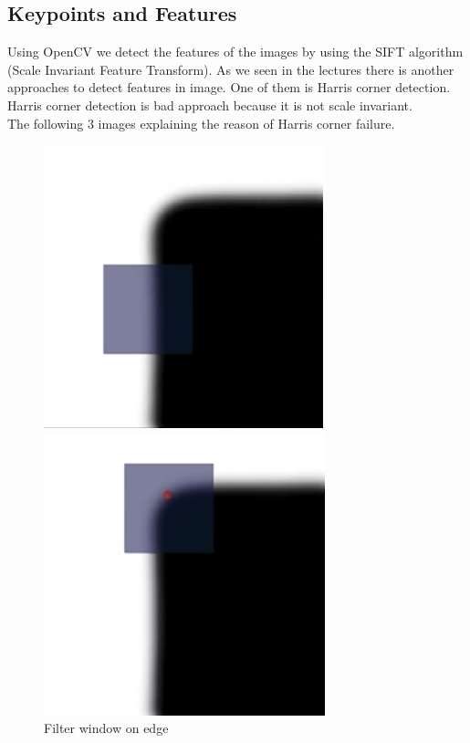 \documentclass[12pt,a4paper]{report}
\begin{document}
\subsection*{Keypoints and Features}
Using OpenCV we detect the features of the images by using the SIFT algorithm (Scale Invariant Feature Transform). As we seen in the lectures there is another approaches to detect features in image. One of them is Harris corner detection. Harris corner detection is bad approach because it is not scale invariant.
\\
The following 3 images explaining the reason of Harris corner failure.
\begin{figure}[!htb]
  \includegraphics[width=\linewidth]{harris_between}
  \caption{Filter window on edge}\label{fig:awesome_image1}
\endminipage\hfill
{}
  \includegraphics[width=\linewidth]{harris_on}

\end{figure}
\end{document}
